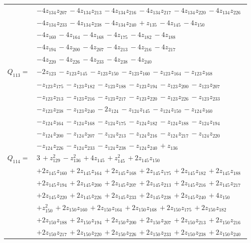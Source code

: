 \begin{longtable}{@{}r p{0.88\linewidth}@{}}
 & $-4z_{134}z_{207}\,-4z_{134}z_{213}\,-4z_{134}z_{216}\,-4z_{134}z_{217}\,-4z_{134}z_{220}\,-4z_{134}z_{226}$\\
 & $-4z_{134}z_{233}\,-4z_{134}z_{238}\,-4z_{134}z_{240}\,+z_{135}\,-4z_{145}\,-4z_{150}$\\
 & $-4z_{160}\,-4z_{164}\,-4z_{168}\,-4z_{175}\,-4z_{182}\,-4z_{188}$\\
 & $-4z_{194}\,-4z_{200}\,-4z_{207}\,-4z_{213}\,-4z_{216}\,-4z_{217}$\\
 & $-4z_{220}\,-4z_{226}\,-4z_{233}\,-4z_{238}\,-4z_{240}$\\[5pt]
$Q_{113}=$ & $-2z_{123}\,-z_{123}z_{145}\,-z_{123}z_{150}\,-z_{123}z_{160}\,-z_{123}z_{164}\,-z_{123}z_{168}$\\
 & $-z_{123}z_{175}\,-z_{123}z_{182}\,-z_{123}z_{188}\,-z_{123}z_{194}\,-z_{123}z_{200}\,-z_{123}z_{207}$\\
 & $-z_{123}z_{213}\,-z_{123}z_{216}\,-z_{123}z_{217}\,-z_{123}z_{220}\,-z_{123}z_{226}\,-z_{123}z_{233}$\\
 & $-z_{123}z_{238}\,-z_{123}z_{240}\,-2z_{124}\,-z_{124}z_{145}\,-z_{124}z_{150}\,-z_{124}z_{160}$\\
 & $-z_{124}z_{164}\,-z_{124}z_{168}\,-z_{124}z_{175}\,-z_{124}z_{182}\,-z_{124}z_{188}\,-z_{124}z_{194}$\\
 & $-z_{124}z_{200}\,-z_{124}z_{207}\,-z_{124}z_{213}\,-z_{124}z_{216}\,-z_{124}z_{217}\,-z_{124}z_{220}$\\
 & $-z_{124}z_{226}\,-z_{124}z_{233}\,-z_{124}z_{238}\,-z_{124}z_{240}\,+z_{136}$\\[5pt]
$Q_{114}=$ & $3\,+z_{129}^{2}\,-z_{136}^{2}\,+4z_{145}\,+z_{145}^{2}\,+2z_{145}z_{150}$\\
 & $+2z_{145}z_{160}\,+2z_{145}z_{164}\,+2z_{145}z_{168}\,+2z_{145}z_{175}\,+2z_{145}z_{182}\,+2z_{145}z_{188}$\\
 & $+2z_{145}z_{194}\,+2z_{145}z_{200}\,+2z_{145}z_{207}\,+2z_{145}z_{213}\,+2z_{145}z_{216}\,+2z_{145}z_{217}$\\
 & $+2z_{145}z_{220}\,+2z_{145}z_{226}\,+2z_{145}z_{233}\,+2z_{145}z_{238}\,+2z_{145}z_{240}\,+4z_{150}$\\
 & $+z_{150}^{2}\,+2z_{150}z_{160}\,+2z_{150}z_{164}\,+2z_{150}z_{168}\,+2z_{150}z_{175}\,+2z_{150}z_{182}$\\
 & $+2z_{150}z_{188}\,+2z_{150}z_{194}\,+2z_{150}z_{200}\,+2z_{150}z_{207}\,+2z_{150}z_{213}\,+2z_{150}z_{216}$\\
 & $+2z_{150}z_{217}\,+2z_{150}z_{220}\,+2z_{150}z_{226}\,+2z_{150}z_{233}\,+2z_{150}z_{238}\,+2z_{150}z_{240}$\\

\end{longtable}
